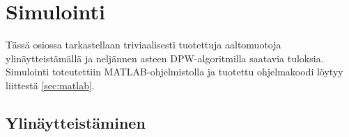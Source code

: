 \documentclass[finnish,12pt,a4paper,pdftex]{article} %
\begin{document}
\clearpage


\section{Simulointi}

Tässä osiossa tarkastellaan triviaalisesti tuotettuja aaltomuotoja ylinäytteistämällä ja neljännen asteen DPW-algoritmilla saatavia tuloksia. Simulointi toteutettiin MATLAB-ohjelmistolla ja tuotettu ohjelmakoodi löytyy liittestä \ref{sec:matlab}.

\subsection{Ylinäytteistäminen} \label{sec:ylinäytsim}
\end{document}
